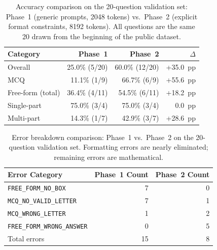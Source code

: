 \documentclass{article}
\begin{document}
\begin{table}[h]
  \caption{Accuracy comparison on the 20-question validation set: Phase~1 (generic prompts, 2048 tokens) vs.\ Phase~2 (explicit format constraints, 8192 tokens). All questions are the same 20 drawn from the beginning of the public dataset.}
  \label{tab:phase2comparison}
  \centering
  \begin{tabular}{lrrr}
    \toprule
    Category & Phase~1 & Phase~2 & $\Delta$ \\
    \midrule
    Overall & 25.0\% (5/20) & 60.0\% (12/20) & +35.0~pp \\
    MCQ & 11.1\% (1/9) & 66.7\% (6/9) & +55.6~pp \\
    Free-form (total) & 36.4\% (4/11) & 54.5\% (6/11) & +18.2~pp \\
    \quad Single-part & 75.0\% (3/4) & 75.0\% (3/4) & 0.0~pp \\
    \quad Multi-part & 14.3\% (1/7) & 42.9\% (3/7) & +28.6~pp \\
    \bottomrule
  \end{tabular}
\end{table}

\begin{table}[h]
  \caption{Error breakdown comparison: Phase~1 vs.\ Phase~2 on the 20-question validation set. Formatting errors are nearly eliminated; remaining errors are mathematical.}
  \label{tab:phase2errors}
  \centering
  \begin{tabular}{lrr}
    \toprule
    Error Category & Phase~1 Count & Phase~2 Count \\
    \midrule
    \texttt{FREE\_FORM\_NO\_BOX}      & 7 & 0 \\
    \texttt{MCQ\_NO\_VALID\_LETTER}   & 7 & 1 \\
    \texttt{MCQ\_WRONG\_LETTER}       & 1 & 2 \\
    \texttt{FREE\_FORM\_WRONG\_ANSWER}& 0 & 5 \\
    \midrule
    Total errors & 15 & 8 \\
    \bottomrule
  \end{tabular}
\end{table}
\end{document}
